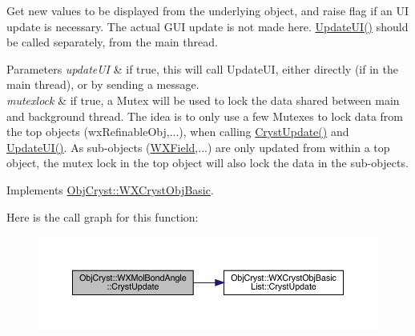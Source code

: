 Get new values to be displayed from the underlying object, and raise flag if an UI update is necessary. The actual G\+UI update is not made here. \mbox{\hyperlink{class_obj_cryst_1_1_w_x_mol_bond_angle_ad9b0fd4485aaff2af3f32ddb1dd2b0f0}{Update\+U\+I()}} should be called separately, from the main thread.


\begin{DoxyParams}{Parameters}
{\em update\+UI} & if true, this will call Update\+UI, either directly (if in the main thread), or by sending a message. \\
\hline
{\em mutexlock} & if true, a Mutex will be used to lock the data shared between main and background thread. The idea is to only use a few Mutexes to lock data from the top objects (wx\+Refinable\+Obj,...), when calling \mbox{\hyperlink{class_obj_cryst_1_1_w_x_mol_bond_angle_a5b2a6926b4fa8ec901eeaac25c954cc8}{Cryst\+Update()}} and \mbox{\hyperlink{class_obj_cryst_1_1_w_x_mol_bond_angle_ad9b0fd4485aaff2af3f32ddb1dd2b0f0}{Update\+U\+I()}}. As sub-\/objects (\mbox{\hyperlink{class_obj_cryst_1_1_w_x_field}{W\+X\+Field}},...) are only updated from within a top object, the mutex lock in the top object will also lock the data in the sub-\/objects. \\
\hline
\end{DoxyParams}


Implements \mbox{\hyperlink{class_obj_cryst_1_1_w_x_cryst_obj_basic_a7ac00ae2ae28f1a6fa26e6fa571186b6}{Obj\+Cryst\+::\+W\+X\+Cryst\+Obj\+Basic}}.

Here is the call graph for this function\+:
\nopagebreak
\begin{figure}[H]
\begin{center}
\leavevmode
\includegraphics[width=350pt]{class_obj_cryst_1_1_w_x_mol_bond_angle_a5b2a6926b4fa8ec901eeaac25c954cc8_cgraph}
\end{center}
\end{figure}
\mbox{\label{class_obj_cryst_1_1_w_x_mol_bond_angle_ad9b0fd4485aaff2af3f32ddb1dd2b0f0}} 
